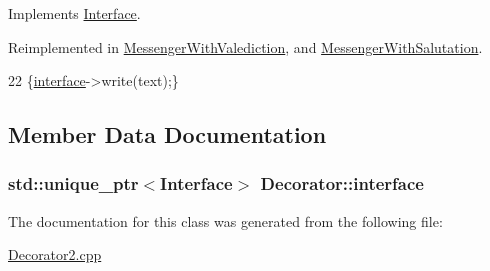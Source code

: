 Implements \hyperlink{classInterface_a8a27e796f257a35b468c06579af48d85}{Interface}.



Reimplemented in \hyperlink{classMessengerWithValediction_a93f7e5fc32a11b58b3c57b54544ec8a2}{Messenger\+With\+Valediction}, and \hyperlink{classMessengerWithSalutation_aed33b1b35b9c5c24f80a3e898aed2487}{Messenger\+With\+Salutation}.


\begin{DoxyCode}
22 \{\hyperlink{classDecorator_a97d246b8a8a01f52ff6cd8f53aac1727}{interface}->write(text);\}
\end{DoxyCode}


\subsection{Member Data Documentation}
\subsubsection[{\texorpdfstring{interface}{interface}}]{\setlength{\rightskip}{0pt plus 5cm}std\+::unique\+\_\+ptr$<${\bf Interface}$>$ Decorator\+::interface\hspace{0.3cm}{\ttfamily [private]}}\hypertarget{classDecorator_a97d246b8a8a01f52ff6cd8f53aac1727}{}\label{classDecorator_a97d246b8a8a01f52ff6cd8f53aac1727}


The documentation for this class was generated from the following file\+:\begin{DoxyCompactItemize}
\item 
\hyperlink{Decorator2_8cpp}{Decorator2.\+cpp}\end{DoxyCompactItemize}
